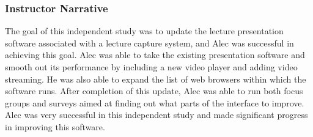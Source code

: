 
\subsubsection*{Instructor Narrative}
The goal of this independent study was to update the lecture
presentation software associated with a lecture capture system, and
Alec was successful in achieving this goal. Alec was able to take
the existing presentation software and smooth out its performance by
including a new video player and adding video streaming. He was also
able to expand the list of web browsers within which the software runs.
After completion of this update, Alec was able to run both focus groups
and surveys aimed at finding out what parts of the interface to improve.
Alec was very successful in this independent study and made significant
progress in improving this software.

